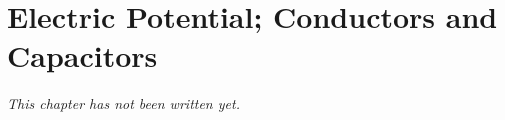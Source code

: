 \chapter{Electric Potential; Conductors and Capacitors}\label{ch:b1:potential-capacitors}


\emph{This chapter has not been written yet.}
